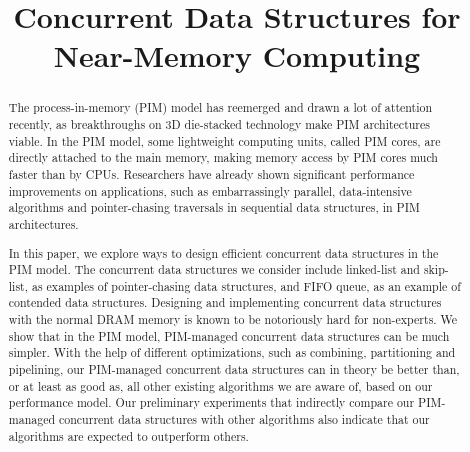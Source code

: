 \documentclass[11pt]{article}
\title{Concurrent Data Structures for Near-Memory Computing}
\author{}
\date{}							%
\begin{document}
\maketitle

\begin{abstract}
The process-in-memory (PIM) model has reemerged and drawn a lot of attention recently, 
as breakthroughs on 3D die-stacked technology make PIM architectures viable. 
In the PIM model, some lightweight computing units, called PIM cores, are directly attached to 
the main memory, making memory access by PIM cores much faster than by CPUs. 
Researchers have already shown significant performance improvements on applications, 
such as embarrassingly parallel, data-intensive algorithms and 
pointer-chasing traversals in sequential data structures, in PIM architectures. 

In this paper, we explore ways to design efficient concurrent data structures in the PIM model. 
The concurrent data structures we consider include linked-list and skip-list, 
as examples of pointer-chasing data structures, 
and FIFO queue, as an example of contended data structures.  
Designing and implementing concurrent data structures with the normal DRAM memory 
is known to be notoriously hard for non-experts. 
We show that in the PIM model, PIM-managed concurrent data structures can be much simpler. 
With the help of different optimizations, such as combining, partitioning and pipelining, 
our PIM-managed concurrent data structures can in theory be better than, or at least as good as, 
all other existing algorithms we are aware of, based on our performance model. 
Our preliminary experiments that indirectly compare our PIM-managed concurrent data structures 
with other algorithms also indicate that our algorithms are expected to outperform others. 
\end{abstract}
\newpage









%









\newpage





\appendix
\end{document}
